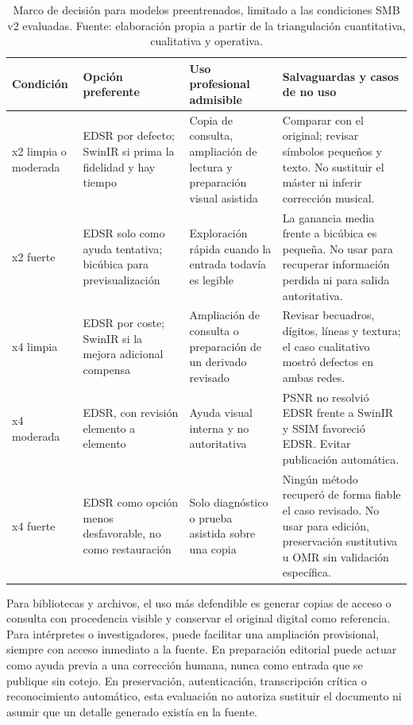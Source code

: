 \begin{table}[htbp]
  \centering
  \footnotesize
  \setlength{\tabcolsep}{3pt}
  \caption{Marco de decisión para modelos preentrenados, limitado a las condiciones SMB v2
  evaluadas. Fuente: elaboración
  propia a partir de la triangulación cuantitativa, cualitativa y operativa.}
  \label{tab:professional-framework}
  \begin{tabular}{p{}p{}p{}p{}}
    \toprule
    Condición & Opción preferente & Uso profesional admisible & Salvaguardas y casos de no uso \\
    \midrule
    x2 limpia o moderada & EDSR por defecto; SwinIR si prima la fidelidad y hay tiempo & Copia de consulta, ampliación de lectura y preparación visual asistida & Comparar con el original; revisar símbolos pequeños y texto. No sustituir el máster ni inferir corrección musical. \\
    x2 fuerte & EDSR solo como ayuda tentativa; bicúbica para previsualización & Exploración rápida cuando la entrada todavía es legible & La ganancia media frente a bicúbica es pequeña. No usar para recuperar información perdida ni para salida autoritativa. \\
    x4 limpia & EDSR por coste; SwinIR si la mejora adicional compensa & Ampliación de consulta o preparación de un derivado revisado & Revisar becuadros, dígitos, líneas y textura; el caso cualitativo mostró defectos en ambas redes. \\
    x4 moderada & EDSR, con revisión elemento a elemento & Ayuda visual interna y no autoritativa & PSNR no resolvió EDSR frente a SwinIR y SSIM favoreció EDSR. Evitar publicación automática. \\
    x4 fuerte & EDSR como opción menos desfavorable, no como restauración & Solo diagnóstico o prueba asistida sobre una copia & Ningún método recuperó de forma fiable el caso revisado. No usar para edición, preservación sustitutiva u OMR sin validación específica. \\
    \bottomrule
  \end{tabular}
\end{table}

Para bibliotecas y archivos, el uso más defendible es generar copias de acceso o consulta con
procedencia visible y conservar el original digital como referencia. Para intérpretes o
investigadores, puede facilitar una ampliación provisional, siempre con acceso inmediato a la
fuente. En preparación editorial puede actuar como ayuda previa a una corrección humana, nunca como
entrada que se publique sin cotejo. En preservación, autenticación, transcripción crítica o
reconocimiento automático, esta evaluación no autoriza sustituir el documento ni asumir que un
detalle generado existía en la fuente.

